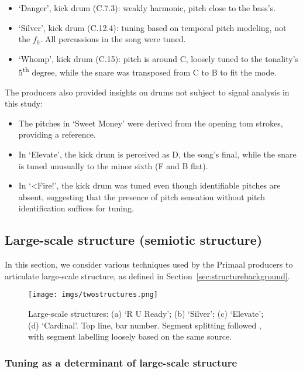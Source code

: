 \documentclass{article}
\begin{document}
\begin{itemize}[noitemsep]
    \item `Danger', kick drum (C.7.3): weakly harmonic, pitch close to the bass's.
    \item `Silver', kick drum (C.12.4): tuning based on temporal pitch modeling, not the $f_0$. All percussions in the song were tuned.
    \item `Whomp', kick drum (C.15): pitch is around C, loosely tuned to the tonality's 5\textsuperscript{th} degree, while the snare was transposed from C to B to fit the mode.
\end{itemize}

The producers also provided insights on drums not subject to signal analysis in this study:

\begin{itemize}[noitemsep]
    \item The pitches in `Sweet Money' were derived from the opening tom strokes, providing a reference.
    \item In `Elevate', the kick drum is perceived as D, the song's final, while the snare is tuned unusually to the minor sixth (F and B flat).
    \item In `<Fire!', the kick drum was tuned even though identifiable pitches are absent, suggesting that the presence of pitch sensation without pitch identification suffices for tuning.
\end{itemize}



\subsection{Large-scale structure (semiotic structure)}\label{sec:largescalestructure}

In this section, we consider various techniques used by the Primaal producers to articulate large-scale structure, as defined in Section~\ref{sec:structurebackground}.

\begin{figure}[htbp]
  \centering
  \texttt{[image: imgs/twostructures.png]}
  \caption{Large-scale structures: (a) `R U Ready'; (b) `Silver'; (c) `Elevate'; (d) `Cardinal'. Top line, bar number. Segment splitting followed \citet{bimbot2012semiotic}, with segment labelling loosely based on the same source.} 
\label{fig:twostructures}
\end{figure}

\subsubsection{Tuning as a determinant of large-scale structure}\label{sec:largescalestructuretuning}
\end{document}
